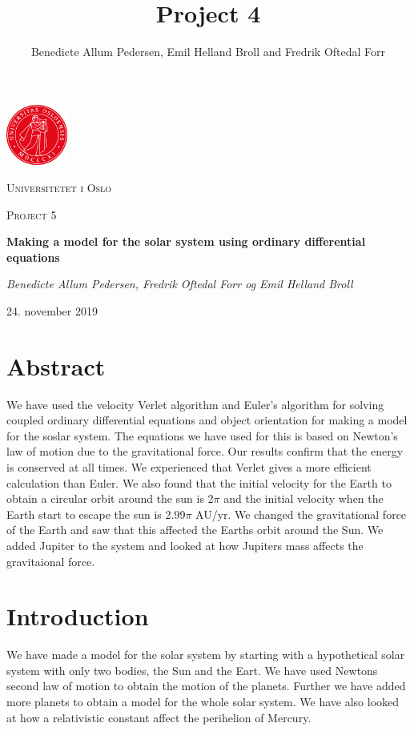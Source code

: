 \documentclass{article}
\title{Project 4}\vspace{-3ex}
\author{Benedicte Allum Pedersen, Emil Helland Broll and Fredrik Oftedal Forr}
\date{\vspace{-5ex}}
\begin{document}
\begin{titlepage}
  \centering
  \includegraphics[width=0.15\textwidth]{./pics/uio.png}\par\vspace{1cm}
  {\scshape\LARGE Universitetet i Oslo\par}
  \vspace{1cm}
  {\scshape\Large Project 5\par}
  \vspace{1.5cm}
  {\huge\bfseries Making a model for the solar system using ordinary differential equations\par}
  \vspace{2cm}
  {\Large\itshape Benedicte Allum Pedersen, Fredrik Oftedal Forr og Emil Helland Broll\par}
	\vfill

  \vfill
  {\large 24. november 2019\par}
\end{titlepage}

\section*{Abstract}
We have used the velocity Verlet algorithm and Euler's algorithm for solving coupled ordinary differential equations and object orientation for making a model for the soslar system. The equations we have used for this is based on Newton's law of motion due to the gravitational force. Our results confirm that the energy is conserved at all times. We experienced that Verlet gives a more efficient calculation than Euler. We also found that the initial velocity for the Earth to obtain a circular orbit around the sun is 2$\pi$ and the initial velocity when the Earth start to escape the sun is 2.99$\pi$ AU/yr. We changed the gravitational force of the Earth and saw that this affected the Earths orbit around the Sun. We added Jupiter to the system and looked at how Jupiters mass affects the gravitaional force.

\tableofcontents

\newpage

\section{Introduction}
We have made a model for the solar system by starting with a hypothetical solar system with only two bodies, the Sun and the Eart. We have used Newtons second law of motion to obtain the motion of the planets. Further we have added more planets to obtain a model for the whole solar system. We have also looked at how a relativistic constant affect the perihelion of Mercury.
\end{document}
